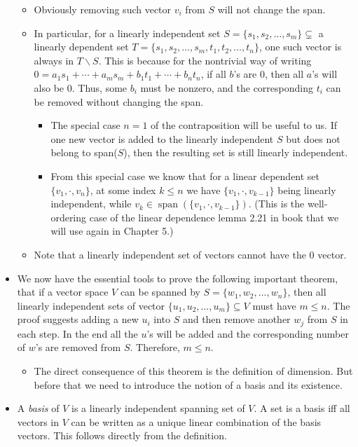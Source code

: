 \documentclass{article}
\newcommand{\s}{\operatorname{span}}
\begin{document}
\begin{itemize}
    \begin{itemize}
        \item Obviously removing such vector $v_i$ from $S$ will not change the span.
        \item In particular, for a linearly independent set $S = \{s_1, s_2, \dots , s_m\} \subsetneq$ a linearly dependent set $T = \{s_1, s_2, \dots , s_m, t_1, t_2, \dots , t_n\}$, one such vector is always in $T \backslash S$. This is because for the nontrivial way of writing $0 = a_1s_1 + \cdots +a_ms_m + b_1 t_1 + \cdots + b_n t_n$, if all $b$'s are 0, then all $a$'s will also be 0. Thus, some $b_i$ must be nonzero, and the corresponding $t_i$ can be removed without changing the span.
        \begin{itemize}
            \item The special case $n=1$ of the contraposition will be useful to us. If one new vector is added to the linearly independent $S$ but does not belong to span($S$), then the resulting set is still linearly independent.
            \item From this special case we know that for a linear dependent set $\{v_1,\cdot,v_n\}$, at some index $k \leq n$ we have $\{v_1,\cdot,v_{k-1}\}$ being linearly independent, while $v_k \in \s(\{v_1,\cdot,v_{k-1}\})$. (This is the well-ordering case of the linear dependence lemma 2.21 in book that we will use again in Chapter 5.)
        \end{itemize}
        \item Note that a linearly independent set of vectors cannot have the $0$ vector.
    \end{itemize}
    \item We now have the essential tools to prove the following important theorem, that if a vector space $V$ can be spanned by $S = \{w_1, w_2, \dots,w_n\}$, then all linearly independent sets of vector $\{u_1,u_2,\dots,u_m\} \subseteq V$ must have $m \leq n$. The proof suggests adding a new $u_i$ into $S$ and then remove another $w_j$ from $S$ in each step. In the end all the $u$'s will be added and the corresponding number of $w$'s are removed from $S$. Therefore, $m \leq n$.
    \begin{itemize}
        \item The direct consequence of this theorem is the definition of dimension. But before that we need to introduce the notion of a basis and its existence.
    \end{itemize}
    \item A \textit{basis} of $V$ is a linearly independent spanning set of $V$. A set is a basis iff all vectors in $V$ can be written as a unique linear combination of the basis vectors. This follows directly from the definition.

\end{itemize}
\end{document}
